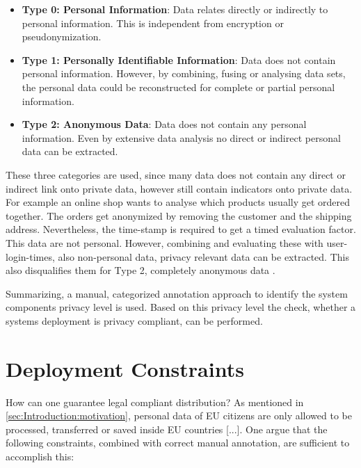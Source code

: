 \begin{itemize}
	\item \textbf{Type 0: Personal Information}: Data relates directly or indirectly to personal information. This is independent from encryption or pseudonymization.
	
	\item \textbf{Type 1: Personally Identifiable Information}:  Data does not contain personal information. However, by combining, fusing or analysing data sets, the personal data could be reconstructed for complete or partial personal information.
	
	\item \textbf{Type 2: Anonymous Data}: Data does not contain any personal information. Even by extensive data analysis no direct or indirect personal data can be extracted.
	
	\label{sec:PrivacyConcept:dataprivacylevel}
\end{itemize}

These three categories are used, since many data does not contain any direct or indirect link onto private data, however still contain indicators onto private data. For example an online shop wants to analyse which products usually get ordered together. The orders get anonymized by removing the customer and the shipping address. Nevertheless, the time-stamp is required to get a timed evaluation factor. This data are not personal. However, combining and evaluating these with user-login-times, also non-personal data, privacy relevant data can be extracted. This also disqualifies them for Type 2, completely anonymous data \cite{Schmieders.}\cite{Schmieders.2015}.

Summarizing, a manual, categorized annotation approach to identify the system components privacy level is used. Based on this privacy level the check, whether a systems deployment is privacy compliant, can be performed.


\section{Deployment Constraints}
\label{sec:PrivacyConcept:deploymentrules}

How can one guarantee legal compliant distribution? As mentioned in \autoref{sec:Introduction:motivation}, personal data of EU citizens are only allowed to be processed, transferred or saved inside EU countries [...]. One argue that the following constraints, combined with correct manual annotation, are sufficient to accomplish this:

